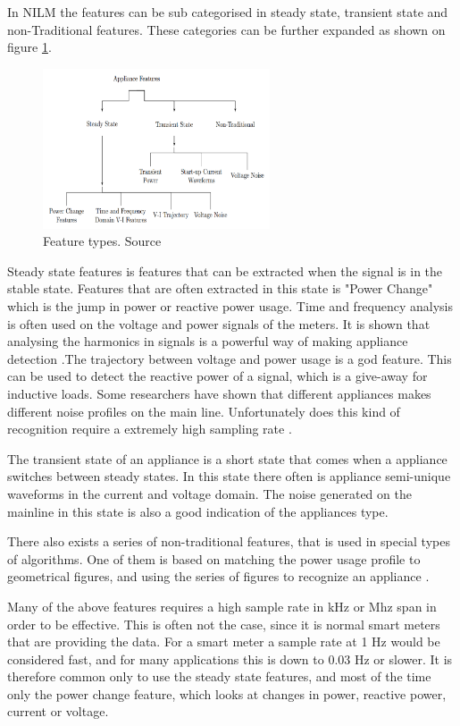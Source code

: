 In NILM the features can be sub categorised in steady state, transient state and non-Traditional features.  These categories can be further expanded as shown on figure \ref{fig:FTR}. 

\begin{figure}[H]
\centering
\includegraphics[width=0.6\textwidth]{billeder/featureOverview.png}
\caption{Feature types. Source \citep{RefWorks:17}}
\label{fig:FTR}
\end{figure}

Steady state features is features that can be extracted when the signal is in the stable state. Features that are often extracted in this state is "Power Change" which is the jump in power or reactive power usage. Time and frequency analysis is often used on the voltage and power signals of the meters. It is shown that analysing the harmonics in signals is a powerful way of making appliance detection .The trajectory between voltage and power usage is a god feature. This can be used to detect the reactive power of a signal, which is a give-away for inductive loads. Some researchers have shown that different appliances makes different noise profiles on the main line. Unfortunately does this kind of recognition require a extremely high sampling rate . 

The transient state of an appliance is a short state that comes when a appliance switches between steady states. In this state there often is appliance semi-unique waveforms in the current and voltage domain. The noise generated on the mainline in this state is also a good indication of the appliances type. 

There also exists a series of non-traditional features, that is used in special types of algorithms. One of them is based on matching the power usage profile to geometrical figures, and using the series of figures to recognize an appliance .  

Many of the above features requires a high sample rate in kHz or Mhz span in order to be effective. This is often not the case, since it is normal smart meters that are providing the data. For a smart meter a sample rate at 1 Hz would be considered fast, and for many applications this is down to $0.03$ Hz or slower. It is therefore common only to use the steady state features, and most of the time only the power change feature, which looks at changes in power, reactive power, current or voltage. 

